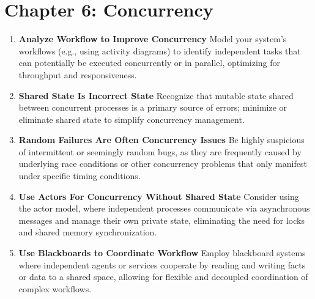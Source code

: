 \documentclass[11pt]{article}
\begin{document}
\section*{Chapter 6: Concurrency}
\begin{enumerate}[label=\arabic*., start=56, itemsep=1ex]
    \item \textbf{Analyze Workflow to Improve Concurrency}
    Model your system's workflows (e.g., using activity diagrams) to identify independent tasks that can potentially be executed concurrently or in parallel, optimizing for throughput and responsiveness.

    \item \textbf{Shared State Is Incorrect State}
    Recognize that mutable state shared between concurrent processes is a primary source of errors; minimize or eliminate shared state to simplify concurrency management.

    \item \textbf{Random Failures Are Often Concurrency Issues}
    Be highly suspicious of intermittent or seemingly random bugs, as they are frequently caused by underlying race conditions or other concurrency problems that only manifest under specific timing conditions.

    \item \textbf{Use Actors For Concurrency Without Shared State}
    Consider using the actor model, where independent processes communicate via asynchronous messages and manage their own private state, eliminating the need for locks and shared memory synchronization.

    \item \textbf{Use Blackboards to Coordinate Workflow}
    Employ blackboard systems where independent agents or services cooperate by reading and writing facts or data to a shared space, allowing for flexible and decoupled coordination of complex workflows.
\end{enumerate}
\end{document}
